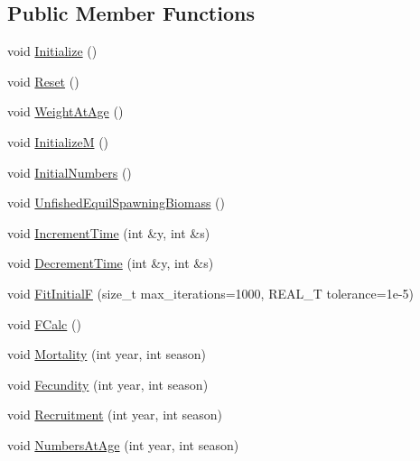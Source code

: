 \subsection*{Public Member Functions}
\begin{DoxyCompactItemize}
\item 
void \hyperlink{structmas_1_1_area_population_info_a893f8e2939dd83a2ab8e465b9706b2d7}{Initialize} ()
\item 
void \hyperlink{structmas_1_1_area_population_info_afda3030fd614e624940e7f7af8635743}{Reset} ()
\item 
void \hyperlink{structmas_1_1_area_population_info_a3f470932353ccf59f5878b495c3a96e3}{Weight\-At\-Age} ()
\item 
void \hyperlink{structmas_1_1_area_population_info_a6eaca87c03aa609ea7bbf929471e0c4d}{Initialize\-M} ()
\item 
void \hyperlink{structmas_1_1_area_population_info_a9140eb45a3f5c805fe910becc071b7c1}{Initial\-Numbers} ()
\item 
void \hyperlink{structmas_1_1_area_population_info_a6a0103263d4bc2a959383a418b8f85f0}{Unfished\-Equil\-Spawning\-Biomass} ()
\item 
void \hyperlink{structmas_1_1_area_population_info_a402454ad4cdb27bca009ed6849480493}{Increment\-Time} (int \&y, int \&s)
\item 
void \hyperlink{structmas_1_1_area_population_info_afdc91af5b79e73a28ec25ac888a7887c}{Decrement\-Time} (int \&y, int \&s)
\item 
void \hyperlink{structmas_1_1_area_population_info_ad1230e6f6231c80999e505cc155871d0}{Fit\-Initial\-F} (size\-\_\-t max\-\_\-iterations=1000, R\-E\-A\-L\-\_\-\-T tolerance=1e-\/5)
\item 
void \hyperlink{structmas_1_1_area_population_info_a239841a4fe87172244cbeaf032377b0c}{F\-Calc} ()
\item 
void \hyperlink{structmas_1_1_area_population_info_a8f0c8db32396c9195b7d4529e0f9a3f8}{Mortality} (int year, int season)
\item 
void \hyperlink{structmas_1_1_area_population_info_af44665ba8836483729f075ef6ae6a319}{Fecundity} (int year, int season)
\item 
void \hyperlink{structmas_1_1_area_population_info_a0a8a880f6240760dd7f09e59d3ff85db}{Recruitment} (int year, int season)
\item 
void \hyperlink{structmas_1_1_area_population_info_a0f622a53062680ea05910957df677c49}{Numbers\-At\-Age} (int year, int season)
\item 

\end{DoxyCompactItemize}
